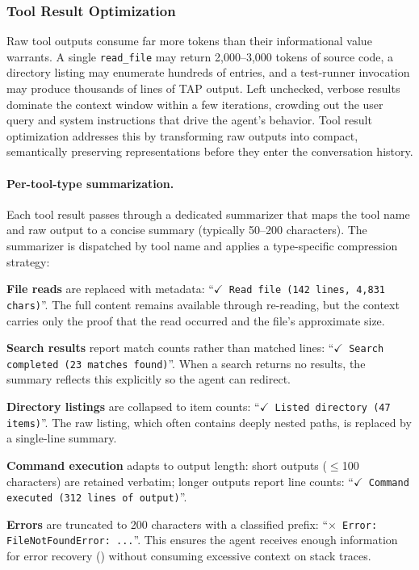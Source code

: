 
\subsubsection{Tool Result Optimization}
\label{sec:tool_results}

Raw tool outputs consume far more tokens than their informational value warrants. A single \texttt{read\_file} may return 2{,}000--3{,}000 tokens of source code, a directory listing may enumerate hundreds of entries, and a test-runner invocation may produce thousands of lines of TAP output. Left unchecked, verbose results dominate the context window within a few iterations, crowding out the user query and system instructions that drive the agent's behavior. Tool result optimization addresses this by transforming raw outputs into compact, semantically preserving representations before they enter the conversation history.

\paragraph{Per-tool-type summarization.}
Each tool result passes through a dedicated summarizer that maps the tool name and raw output to a concise summary (typically 50--200 characters). The summarizer is dispatched by tool name and applies a type-specific compression strategy:

\begin{packeditemize}
\item \textbf{File reads} are replaced with metadata: ``\texttt{$\checkmark$ Read file (142 lines, 4{,}831 chars)}''. The full content remains available through re-reading, but the context carries only the proof that the read occurred and the file's approximate size.

\item \textbf{Search results} report match counts rather than matched lines: ``\texttt{$\checkmark$ Search completed (23 matches found)}''. When a search returns no results, the summary reflects this explicitly so the agent can redirect.

\item \textbf{Directory listings} are collapsed to item counts: ``\texttt{$\checkmark$ Listed directory (47 items)}''. The raw listing, which often contains deeply nested paths, is replaced by a single-line summary.

\item \textbf{Command execution} adapts to output length: short outputs ($\leq$100 characters) are retained verbatim; longer outputs report line counts: ``\texttt{$\checkmark$ Command executed (312 lines of output)}''.

\item \textbf{Errors} are truncated to 200 characters with a classified prefix: ``\texttt{$\times$ Error: FileNotFoundError: ...}''. This ensures the agent receives enough information for error recovery () without consuming excessive context on stack traces.
\end{packeditemize}

